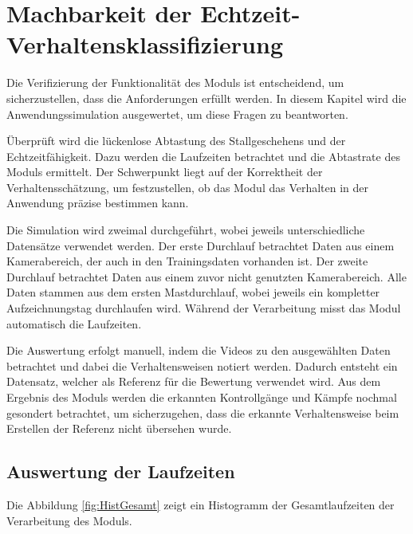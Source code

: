 \section{Machbarkeit der Echtzeit-Verhaltensklassifizierung} \label{sec:Ergeb Sim}
Die Verifizierung der Funktionalität des Moduls ist entscheidend, um sicherzustellen, dass  die Anforderungen erfüllt werden. In diesem Kapitel wird die Anwendungssimulation ausgewertet, um diese Fragen zu beantworten. \par

Überprüft wird die lückenlose Abtastung des Stallgeschehens und der Echtzeitfähigkeit. Dazu werden die Laufzeiten betrachtet und die Abtastrate des Moduls ermittelt. Der Schwerpunkt liegt auf der Korrektheit der Verhaltensschätzung, um festzustellen, ob das Modul das Verhalten in der Anwendung präzise bestimmen kann. \par

Die Simulation wird zweimal durchgeführt, wobei jeweils unterschiedliche Datensätze verwendet werden. Der erste Durchlauf betrachtet Daten aus einem Kamerabereich, der auch in den Trainingsdaten vorhanden ist. Der zweite Durchlauf betrachtet Daten aus einem zuvor nicht genutzten Kamerabereich. Alle Daten stammen aus dem ersten Mastdurchlauf, wobei jeweils ein kompletter Aufzeichnungstag durchlaufen wird. Während der Verarbeitung misst das Modul automatisch die Laufzeiten. \par

Die Auswertung erfolgt manuell, indem die Videos zu den ausgewählten Daten betrachtet und dabei die Verhaltensweisen notiert werden. Dadurch entsteht ein Datensatz, welcher als Referenz für die Bewertung verwendet wird. Aus dem Ergebnis des Moduls werden die erkannten Kontrollgänge und Kämpfe nochmal gesondert betrachtet, um sicherzugehen, dass die erkannte Verhaltensweise beim Erstellen der Referenz nicht übersehen wurde.\par

\subsection{Auswertung der Laufzeiten}

Die Abbildung \ref{fig:HistGesamt} zeigt ein Histogramm der Gesamtlaufzeiten der Verarbeitung des Moduls.  

